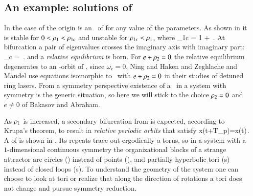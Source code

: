 
\subsection{\label{s:CLEsols} An example: solutions of \cLe}

In the case of {\cLe}  the origin  is an \eqv\ of
 for any value of the parameters. As shown in
 it is stable for $0<\rho_1<\rho_{1c}$
and unstable for $\rho_{1c}<\rho_1$, where
\beq
	\rho_{1c} = 1 + \,.
\eeq
At bifurcation a pair of eigenvalues crosses the imaginary
axis with imaginary part:
\beq
	\omega_c = \,.
	\label{eq:omegaCLE}
\eeq
and a \emph{relative equilibrium}  is born. For
$e+\rho_2=0$ the relative equilibrium degenerates to an
-orbit of \eqva{}, since $\omega_c =0$.
Ning and Haken and Zeghlache and
Mandel use equations isomorphic to \cLe\ with
$e+\rho_2=0$ in their studies of detuned ring lasers. From
a symmetry perspective existence of a \reqv\ in a system with
 symmetry is the generic situation, so here we will
stick to the choice $\rho_2=0$ and $e \neq 0$ of Bakasov
and Abraham.

As $\rho_1$ is increased,  a secondary bifurcation from
 is expected, according to Krupa's
theorem, to result in \emph{relative periodic
orbits} that satisfy
\beq
	x(t+T_p)=x(t)\,.
\eeq
A {\rpo} of {\cLe} is shown in . Its repeats
trace out ergodically a torus, so in a system with a
$1$-dimensional continuous symmetry the organizational blocks
of a strange attractor are circles (\reqva) instead of points
(\eqva), and partially hyperbolic tori (\rpo s) instead of
closed loops (\po s). To understand the geometry of the
system one can choose to look at tori or realize that along
the direction of rotations a tori does not change and pursue
symmetry reduction.


